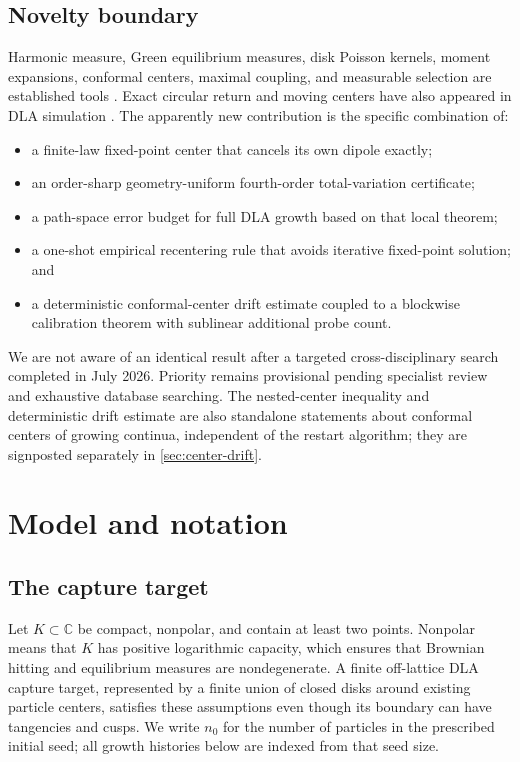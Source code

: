 \documentclass[11pt]{article}
\theoremstyle{mainthm}
\theoremstyle{definition}
\theoremstyle{remark}
\newcommand{\C}{\mathbb C}
\begin{document}
\subsection{Novelty boundary}

Harmonic measure, Green equilibrium measures, disk Poisson kernels, moment expansions, conformal centers, maximal coupling, and measurable selection are established tools \cite{Ransford1995,SaffTotik1997,GarnettMarshall2005,Lindvall1992,Kallenberg2021}. Exact circular return and moving centers have also appeared in DLA simulation \cite{MenshutinShchur2006,LeeLuo1992}. The apparently new contribution is the specific combination of:

\begin{itemize}
  \item a finite-law fixed-point center that cancels its own dipole exactly;
  \item an order-sharp geometry-uniform fourth-order total-variation certificate;
  \item a path-space error budget for full DLA growth based on that local theorem;
  \item a one-shot empirical recentering rule that avoids iterative fixed-point solution; and
  \item a deterministic conformal-center drift estimate coupled to a blockwise calibration theorem with sublinear additional probe count.
\end{itemize}

We are not aware of an identical result after a targeted cross-disciplinary search completed in July 2026. Priority remains provisional pending specialist review and exhaustive database searching. The nested-center inequality and deterministic drift estimate are also standalone statements about conformal centers of growing continua, independent of the restart algorithm; they are signposted separately in \cref{sec:center-drift}.

\section{Model and notation}

\subsection{The capture target}

Let $K\subset\C$ be compact, nonpolar, and contain at least two points. Nonpolar means that $K$ has positive logarithmic capacity, which ensures that Brownian hitting and equilibrium measures are nondegenerate. A finite off-lattice DLA capture target, represented by a finite union of closed disks around existing particle centers, satisfies these assumptions even though its boundary can have tangencies and cusps. We write $n_0$ for the number of particles in the prescribed initial seed; all growth histories below are indexed from that seed size.
\end{document}
